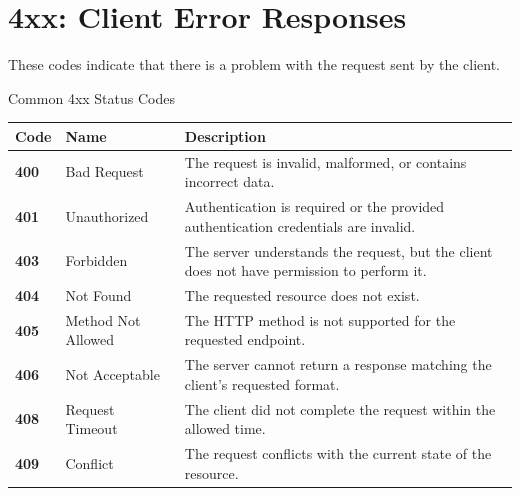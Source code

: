 \documentclass[a4paper]{article}
\begin{document}
    
    \section{4xx: Client Error Responses}
        
        These codes indicate that there is a problem with the request sent by the
        client.
        
        \begin{statuscategory}{Common 4xx Status Codes}
            \begin{longtable}{
                    >{\ttfamily\bfseries}p{1.5cm}
                p{4cm}
                p{8cm}
            }
                \toprule
                \textnormal{\textbf{Code}} &
                \textbf{Name} &
                \textbf{Description} \\
                \midrule
                400 &
                Bad Request &
                The request is invalid, malformed, or contains incorrect data. \\
                
                401 &
                Unauthorized &
                Authentication is required or the provided authentication credentials are invalid. \\
                
                403 &
                Forbidden &
                The server understands the request, but the client does not have permission
                to perform it. \\
                
                404 &
                Not Found &
                The requested resource does not exist. \\
                
                405 &
                Method Not Allowed &
                The HTTP method is not supported for the requested endpoint. \\
                
                406 &
                Not Acceptable &
                The server cannot return a response matching the client's requested format. \\
                
                408 &
                Request Timeout &
                The client did not complete the request within the allowed time. \\
                
                409 &
                Conflict &
                The request conflicts with the current state of the resource. \\
                

\end{longtable}
\end{statuscategory}
\end{document}
